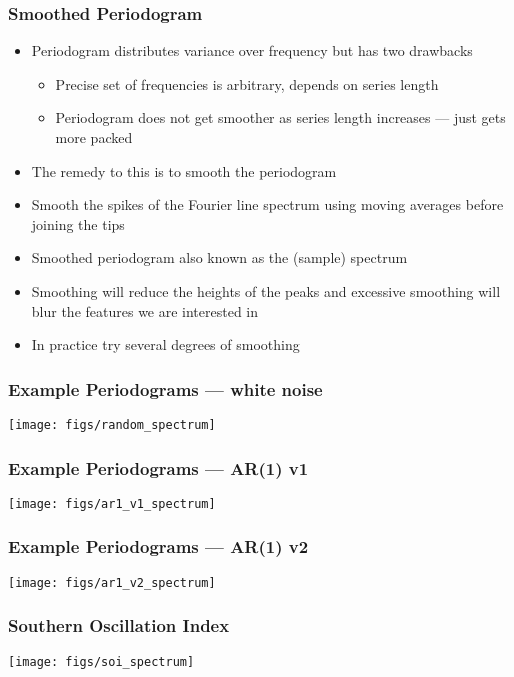 \documentclass{beamer}
\begin{document}
\begin{frame}
    \frametitle{Smoothed Periodogram}
    \begin{itemize}
        \item Periodogram distributes variance over frequency but has two drawbacks
        \begin{itemize}
            \item Precise set of frequencies is arbitrary, depends on series length
            \item Periodogram does not get smoother as series length increases --- just gets more packed
        \end{itemize}
        \item The remedy to this is to \alert{smooth} the periodogram
        \item Smooth the spikes of the Fourier line spectrum using moving averages before joining the tips
        \item \alert{Smoothed periodogram} also known as the \alert{(sample) spectrum}
        \item Smoothing will reduce the heights of the peaks and excessive smoothing will blur the features we are interested in
        \item In practice try several degrees of smoothing
    \end{itemize}
\end{frame}

\begin{frame}
    \frametitle{Example Periodograms --- white noise}
    \begin{center}
        \texttt{[image: figs/random\_spectrum]}
    \end{center}
\end{frame}

\begin{frame}
    \frametitle{Example Periodograms --- AR(1) v1}
    \begin{center}
        \texttt{[image: figs/ar1\_v1\_spectrum]}
    \end{center}
\end{frame}

\begin{frame}
    \frametitle{Example Periodograms --- AR(1) v2}
    \begin{center}
        \texttt{[image: figs/ar1\_v2\_spectrum]}
    \end{center}
\end{frame}

\begin{frame}
    \frametitle{Southern Oscillation Index}
    \begin{center}
        \texttt{[image: figs/soi\_spectrum]}
    \end{center}
\end{frame}
\end{document}
